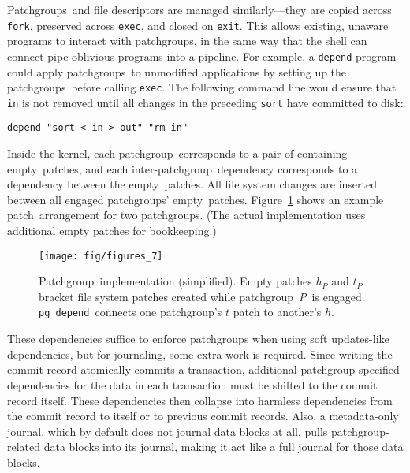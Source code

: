 \documentclass[9pt,twocolumn,letterpaper]{article}
\newcommand{\pgDepend}{\texttt{pg\_depend}}
\newcommand{\pgPgNf}{P}
\newcommand{\pgPg}{{\rmfamily\itshape \pgPgNf\/}}
\newcommand{\patch}{patch}
\newcommand{\patches}{patches}
\newcommand{\Patches}{Patches}
\newcommand{\patchgroup}{patchgroup}
\newcommand{\patchgroups}{patchgroups}
\newcommand{\Patchgroup}{Patchgroup}
\newcommand{\Patchgroups}{Patchgroups}
\newcommand{\noop}{empty}
\begin{document}
\Patchgroups\ and file descriptors are managed similarly---they are copied
across \texttt{fork}, preserved across \texttt{exec}, and closed on
\texttt{exit}.
%
This allows existing, unaware programs to interact with \patchgroups,
in the same way that the shell can connect pipe-oblivious programs
into a pipeline.
%
For example, a \texttt{depend} program could apply \patchgroups\ to
unmodified applications by setting up the \patchgroups\ before calling
\texttt{exec}.  The following command line would ensure that \texttt{in} is
not removed until all changes in the preceding \texttt{sort} have committed
to disk:

\vspace{-0.5\baselineskip}
\begin{center}
\begin{small}
\verb+depend "sort < in > out" "rm in"+
\end{small}
\end{center}
\vspace{-0.5\baselineskip}


Inside the kernel, each \patchgroup\ corresponds to a pair of containing
\noop\ \patches,
and each inter-\patchgroup\ dependency corresponds to a dependency between
the \noop\ \patches.
%
All file system changes are inserted
between all engaged \patchgroups' \noop\ \patches.
%
Figure~\ref{fig:patchgroup-patches} shows an example \patch\ arrangement for
two \patchgroups.
%
(The actual implementation uses additional empty patches for bookkeeping.)

\begin{figure}[t]
\centering
\texttt{[image: fig/figures\_7]}
\caption{\Patchgroup\ implementation (simplified).  Empty
patches $h_{\pgPgNf}$ and $t_{\pgPgNf}$ bracket file system patches created while
\patchgroup\ \pgPg\ is engaged.  \pgDepend\ connects one
\patchgroup's $t$ patch to another's $h$.}
\label{fig:patchgroup-patches} 
\end{figure}

These dependencies suffice to enforce patchgroups when using soft
updates-like dependencies, but for journaling, some extra work is required.
%
Since writing the commit record atomically commits a
transaction, additional \patchgroup-specified dependencies for the data in each
transaction must be shifted to the commit record itself.
%
These dependencies then collapse into harmless dependencies from the commit
record to itself or to previous commit records.
%
Also, a metadata-only journal, which by default does not journal data
blocks at all, pulls \patchgroup-related data blocks into its journal,
making it act like a full journal for those data blocks.
\end{document}
